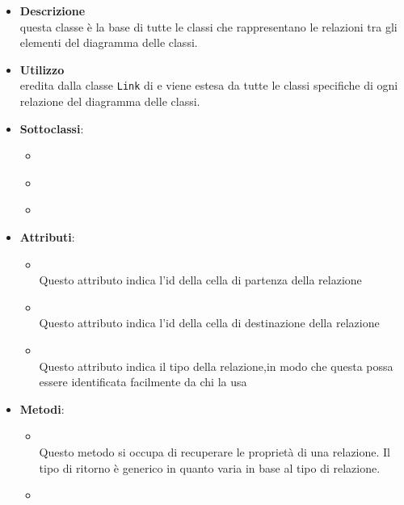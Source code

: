 \label{\nogloxy{swedesigner::client::model::celltypes::class::ClassDiagramLink}}
\begin{itemize}
\item \textbf{Descrizione}\\
questa classe è la base di tutte le classi che rappresentano le relazioni tra gli elementi del diagramma delle classi.
\item \textbf{Utilizzo}\\
eredita dalla classe \texttt{Link} di \jointjs{} e viene estesa da tutte le classi specifiche di ogni relazione del diagramma delle classi.
\item \textbf{Sottoclassi}:
\begin{itemize}
\item \hyperref[\nogloxy{swedesigner::client::model::celltypes::class::HxAssociation}]{}
\item \hyperref[\nogloxy{swedesigner::client::model::celltypes::class::HxGeneralization}]{}
\item \hyperref[\nogloxy{swedesigner::client::model::celltypes::class::HxImplementation}]{}
\end{itemize}
\item \textbf{Attributi}:
\begin{itemize}
\item {}
\\ Questo attributo indica l'id della cella di partenza della relazione
\item {}
\\ Questo attributo indica l'id della cella di destinazione della relazione
\item {}
\\ Questo attributo indica il tipo della relazione,in modo che questa possa essere identificata facilmente da chi la usa
\end{itemize}
\item \textbf{Metodi}:
\begin{itemize}
\item {}
\\ Questo metodo si occupa di recuperare le proprietà di una relazione. Il tipo di ritorno è generico in quanto varia in base al tipo di relazione.
\item {}

\end{itemize}
\end{itemize}
